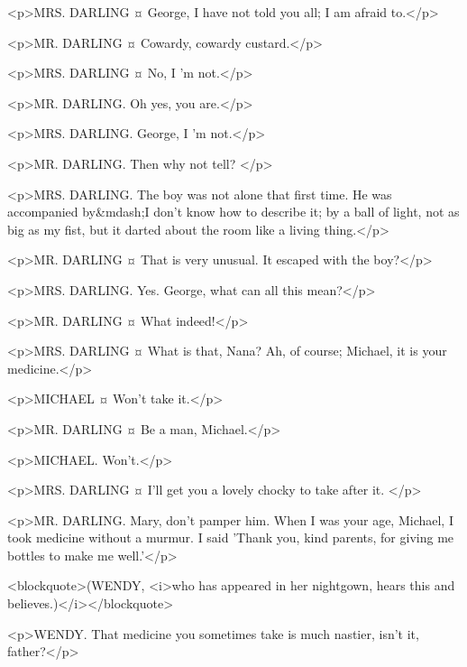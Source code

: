 
<p>MRS. DARLING ¤
George, I have not told you all; I am afraid to.</p>

<p>MR. DARLING ¤
Cowardy, cowardy custard.</p>

<p>MRS. DARLING ¤
No, I 'm not.</p>

<p>MR. DARLING. Oh yes, you are.</p>

<p>MRS. DARLING. George, I 'm not.</p>

<p>MR. DARLING. Then why not tell?
</p>

<p>MRS. DARLING. The boy was not alone that first time. He was accompanied by&mdash;I don't know how to describe it; by a ball of light, not as big as my fist, but it darted about the room like a living thing.</p>

<p>MR. DARLING ¤
That is very unusual. It escaped with the boy?</p>

<p>MRS. DARLING. Yes.
George, what can all this mean?</p>

<p>MR. DARLING ¤
What indeed!</p>


<p>MRS. DARLING ¤
What is that, Nana? Ah, of course; Michael, it is your medicine.</p>

<p>MICHAEL ¤
Won't take it.</p>

<p>MR. DARLING ¤
Be a man, Michael.</p>

<p>MICHAEL. Won't.</p>

<p>MRS. DARLING ¤
I'll get you a lovely chocky to take after it.
</p>

<p>MR. DARLING. Mary, don't pamper him. When I was your age, Michael, I took medicine without a murmur. I said 'Thank you, kind parents, for giving me bottles to make me well.'</p>

<blockquote>(WENDY, <i>who has appeared in her nightgown, hears this and believes.)</i></blockquote>

<p>WENDY. That medicine you sometimes take is much nastier, isn't it, father?</p>

